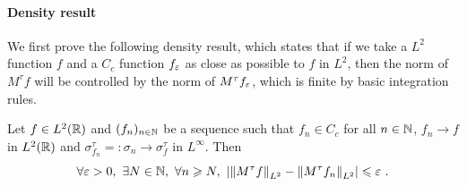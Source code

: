 \paragraph{Density result}

We first prove the following density result, which states that if we take a $L^2$ function $f$ and a $C_c$ function $f_\varepsilon$ as close as possible to $f$ in $L^2$, then the norm of $M^\tau f$ will be controlled by the norm of $M^\tau f_\varepsilon$, which is finite by basic integration rules.

\begin{lemma}\label{lemma_density_result}
    Let $f\in L^2(\mathbb{R})$ and $(f_n)_{n\in\mathbb{N}}$ be a sequence such that $f_n \in C_c$ for all $n\in\mathbb{N}$, $f_n \rightarrow f$ in $L^2(\mathbb{R})$ and $\sigma_{f_n}^\tau=:\sigma_n\rightarrow \sigma_f^\tau$ in $L^\infty$. Then
    \begin{equation}
        \forall \eps>0,\ \exists N\in\N,\ \forall n\geqslant N,\ \left|\left\|M^\tau f\right\|_{L^2} - \left\|M^\tau f_n \right\|_{L^2} \right| \leqslant \eps\ .
    \end{equation}
\end{lemma}

